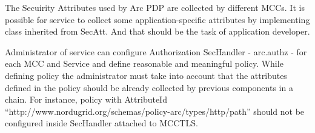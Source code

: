 \documentclass[a4paper]{article}
\begin{document}
{\color{black}
The Secuirity Attributes used by Arc PDP are collected by different
MCCs. It is possible for service to collect some application-specific
attributes by implementing class inherited from SecAtt. And that should
be the task of application developer.}

{\upshape\color{black}
Administrator of service can configure Authorization SecHandler -
arc.authz - for each MCC and Service and define reasonable and
meaningful policy. While defining policy the administrator must take
into account that the attributes defined in the policy should be
already collected by previous components in a chain. For instance,
policy with AttributeId
{\textquotedblleft}http://www.nordugrid.org/schemas/policy-arc/types/http/path{\textquotedblright}
should not be configured inside SecHandler attached to MCCTLS. }
\end{document}
